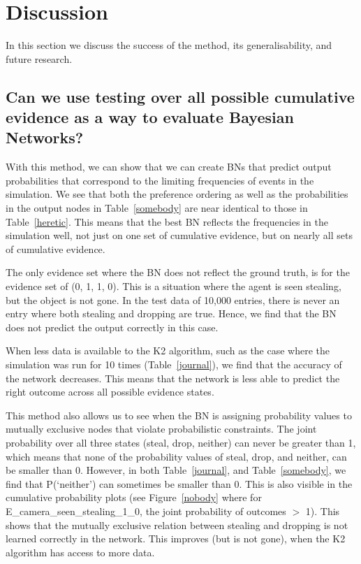 \documentclass[11pt]{article}
\begin{document}
\section{Discussion}
In this section we discuss the success of the method, its generalisability, and future research.


\subsection{Can we use testing over all possible cumulative evidence as a way to evaluate Bayesian Networks?}
With this method, we can show that we can create BNs that predict output probabilities that correspond to the limiting frequencies of events in the simulation. We see that both the preference ordering as well as the probabilities in the output nodes in Table~\ref{somebody} are near identical to those in Table~\ref{heretic}. This means that the best BN reflects the frequencies in the simulation well, not just on one set of cumulative evidence, but on nearly all sets of cumulative evidence. 

The only evidence set where the BN does not reflect the ground truth, is for the evidence set of (0, 1, 1, 0). This is a situation where the agent is seen stealing, but the object is not gone. In the test data of 10,000 entries, there is never an entry where both stealing and dropping are true. Hence, we find that the BN does not predict the output correctly in this case. 

When less data is available to the K2 algorithm, such as the case where the simulation was run for 10 times (Table~\ref{journal}), we find that the accuracy of the network decreases. This means that the network is less able to predict the right outcome across all possible evidence states.

This method also allows us to see when the BN is assigning probability values to mutually exclusive nodes that violate probabilistic constraints. The joint probability over all three states (steal, drop, neither) can never be greater than 1, which means that none of the probability values of steal, drop, and neither, can be smaller than 0. However, in both Table~\ref{journal}, and Table~\ref{somebody}, we find that P(`neither') can sometimes be smaller than 0. This is also visible in the cumulative probability plots (see Figure~\ref{nobody} where for E\_camera\_seen\_stealing\_1\_0, the joint probability of outcomes $>$ 1). This shows that the mutually exclusive relation between stealing and dropping is not learned correctly in the network. This improves (but is not gone), when the K2 algorithm has access to more data.
\end{document}
